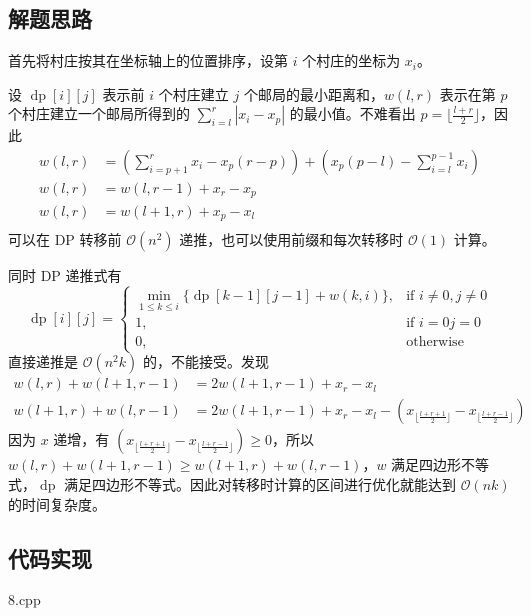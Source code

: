 \subsection{解题思路}

首先将村庄按其在坐标轴上的位置排序，设第 \(i\) 个村庄的坐标为 \(x_i\)。

设 \(\operatorname{dp}[i][j]\) 表示前 \(i\) 个村庄建立 \(j\)
个邮局的最小距离和，\(w(l,r)\) 表示在第 \(p\) 个村庄建立一个邮局所得到的
\(\sum_{i=l}^r|x_i-x_p|\) 的最小值。不难看出
\(p=\lfloor \frac{l+r}{2}\rfloor\)，因此 \[
\begin{aligned}
w(l,r)&=(\sum_{i=p+1}^rx_i-x_p(r-p))+(x_p(p-l)-\sum_{i=l}^{p-1}x_i)\\
w(l,r)&=w(l,r-1)+x_r-x_p\\
w(l,r)&=w(l+1,r)+x_p-x_l\\
\end{aligned}
\] 可以在 DP 转移前 \(\mathcal{O}(n^2)\)
递推，也可以使用前缀和每次转移时 \(\mathcal{O}(1)\) 计算。

同时 DP 递推式有 \[
\operatorname{dp}[i][j]=
\left\{
\begin{array}{ll}
\min\limits_{1\le k\le i}\{\operatorname{dp}[k-1][j-1]+w(k,i)\},&\text{if } i\neq0,j\neq0\\
1,&\text{if }i=0 j=0\\
0,&\text{otherwise}
\end{array}
\right.
\] 直接递推是 \(\mathcal{O}(n^2k)\) 的，不能接受。发现 \[
\begin{aligned}
w(l,r)+w(l+1,r-1)&=2w(l+1,r-1)+x_r-x_l\\
w(l+1,r)+w(l,r-1)&=2w(l+1,r-1)+x_r-x_l-(x_{\lfloor \frac{l+r+1}{2}\rfloor}-x_{\lfloor \frac{l+r-1}{2}\rfloor})
\end{aligned}
\] 因为 \(x\) 递增，有
\((x_{\lfloor \frac{l+r+1}{2}\rfloor}-x_{\lfloor \frac{l+r-1}{2}\rfloor})\ge0\)，所以
\(w(l,r)+w(l+1,r-1)\ge w(l+1,r)+w(l,r-1)\)，\(w\)
满足四边形不等式，\(\operatorname{dp}\)
满足四边形不等式。因此对转移时计算的区间进行优化就能达到
\(\mathcal{O}(nk)\) 的时间复杂度。

\subsection{代码实现}

8.cpp
